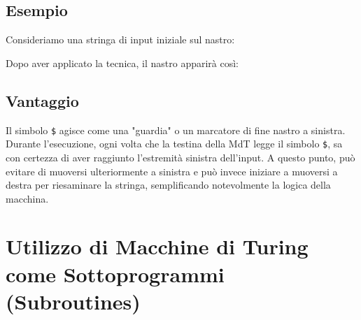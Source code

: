 \documentclass[a4paper]{article}
\theoremstyle{definition} %
\newcommand{\blankS}{\ensuremath{\raisebox{-0.15ex}{\scalebox{1.3}[0.7]{$\sqcup$}}\mkern2mu}}
\begin{document}
\subsection{Esempio}
Consideriamo una stringa di input iniziale sul nastro:
\begin{center}
\end{center}
Dopo aver applicato la tecnica, il nastro apparirà così:
\begin{center}
\end{center}

\subsection{Vantaggio}
Il simbolo \texttt{\$} agisce come una "guardia" o un marcatore di fine nastro a sinistra. Durante l'esecuzione, ogni volta che la testina della MdT legge il simbolo \texttt{\$}, sa con certezza di aver raggiunto l'estremità sinistra dell'input. A questo punto, può evitare di muoversi ulteriormente a sinistra e può invece iniziare a muoversi a destra per riesaminare la stringa, semplificando notevolmente la logica della macchina.

\section{Utilizzo di Macchine di Turing come Sottoprogrammi (Subroutines)}
\end{document}
